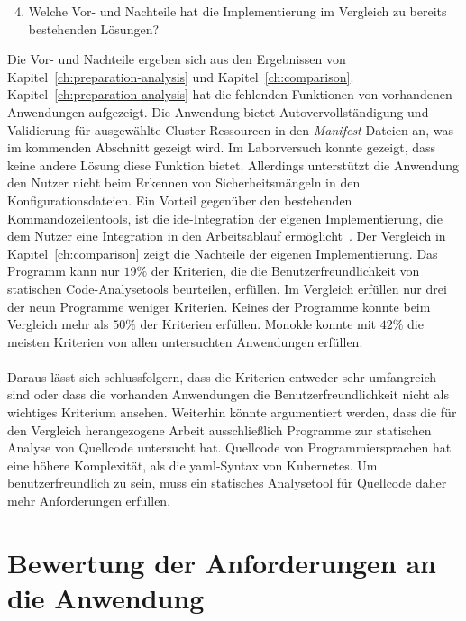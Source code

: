 \begin{enumerate}
    \setcounter{enumi}{3}
    \item Welche Vor- und Nachteile hat die Implementierung im Vergleich zu bereits bestehenden Lösungen?
\end{enumerate}

Die Vor- und Nachteile ergeben sich aus den Ergebnissen von Kapitel~\ref{ch:preparation-analysis} und Kapitel~\ref{ch:comparison}.
Kapitel~\ref{ch:preparation-analysis} hat die fehlenden Funktionen von vorhandenen Anwendungen aufgezeigt.
Die Anwendung bietet Autovervollständigung und Validierung für ausgewählte Cluster-Ressourcen in den \textit{Manifest}-Dateien an, was im kommenden Abschnitt gezeigt wird.
Im Laborversuch konnte gezeigt, dass keine andere Lösung diese Funktion bietet.
Allerdings unterstützt die Anwendung den Nutzer nicht beim Erkennen von Sicherheitsmängeln in den Konfigurationsdateien. Ein Vorteil gegenüber den bestehenden
Kommandozeilentools, ist die \ac{ide}-Integration der eigenen Implementierung, die dem Nutzer eine Integration in den Arbeitsablauf ermöglicht~\cite{usability-criteria-static-analysis-tools}.
Der Vergleich in Kapitel~\ref{ch:comparison} zeigt die Nachteile der eigenen Implementierung. Das Programm kann nur $19\%$ der Kriterien, die die
Benutzerfreundlichkeit von statischen Code-Analysetools beurteilen, erfüllen. Im Vergleich erfüllen nur drei der neun Programme weniger Kriterien.
Keines der Programme konnte beim Vergleich mehr als $50\%$ der Kriterien erfüllen.
Monokle konnte mit $42\%$ die meisten Kriterien von allen untersuchten Anwendungen erfüllen.
\\\\
Daraus lässt sich schlussfolgern, dass die Kriterien entweder sehr umfangreich sind oder dass die vorhanden Anwendungen
die Benutzerfreundlichkeit nicht als wichtiges Kriterium ansehen.
Weiterhin könnte argumentiert werden, dass die für den Vergleich herangezogene Arbeit ausschließlich Programme zur statischen Analyse
von Quellcode untersucht hat. Quellcode von Programmiersprachen hat eine höhere Komplexität, als die \ac{yaml}-Syntax von Kubernetes.
Um benutzerfreundlich zu sein, muss ein statisches Analysetool für Quellcode daher mehr Anforderungen erfüllen.

\section{Bewertung der Anforderungen an die Anwendung}\label{sec:evaluation-requirements}

